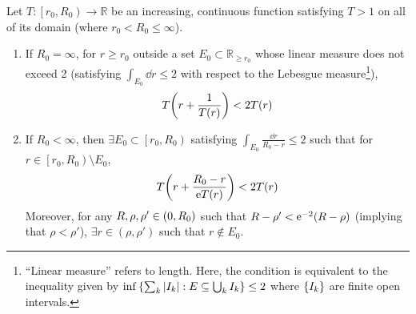 \begin{lemma}\label{lem:nevanlinnaborel}
    Let \(T:\left[r_0,R_0\right)\to\mathbb{R}\) be an increasing, continuous function satisfying \(T>1\) on all of its domain (where \(r_0<R_0\leq\infty\)).
    \begin{enumerate}
        \item If \(R_0=\infty\), for \(r\geq r_0\) outside a set \(E_0\subset\mathbb{R}_{\geq r_0}\) whose linear measure does not exceed 2 (satisfying \(\textstyle\int_{E_0}\dd{r}\le2\) with respect to the Lebesgue measure\footnote{``Linear measure'' refers to length. Here, the condition is equivalent to the inequality given by \(\textstyle\inf\cbraces{\sum_k\abs{I_k}}{E\subseteq\bigcup_k I_k}\le2\) where \(\cbraces{I_k}\) are finite open intervals.}),
            \begin{equation}
                T\qty(r+\frac1{T(r)})<2T(r)\label{eq:nevanlinnaborel_infiniteradius}
            \end{equation}
        \item If \(R_0<\infty\), then \(\exists E_0\subset\left[r_0,R_0\right)\) satisfying \(\textstyle\int_{E_0}\frac{\dd{r}}{R_0-r}\leq2\) such that for \(r\in\left[r_0,R_0\right)\setminus E_0\),
            \begin{equation}
                T\qty(r+\frac{R_0-r}{\mathrm{e} T(r)})<2T(r)\label{eq:nevanlinnaborel_finiteradius}
            \end{equation}
            Moreover, for any \(R,\rho,\rho'\in\qty(0,R_0)\) such that \(R-\rho'<\mathrm{e}^{-2}\qty(R-\rho)\) (implying that \(\rho<\rho'\)), \(\exists r\in(\rho,\rho')\) such that \(r\notin E_0\).
    \end{enumerate}
\end{lemma}
